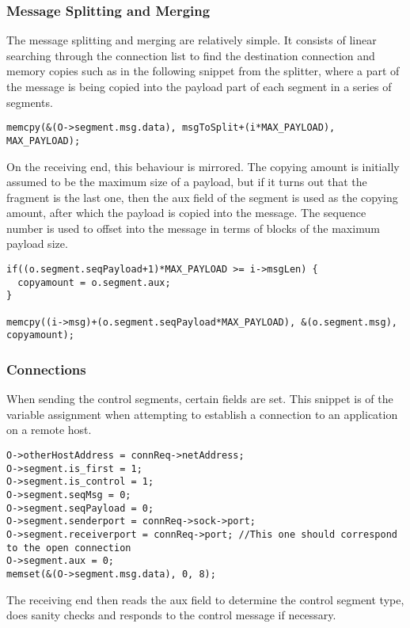 \subsubsection{Message Splitting and Merging}
The message splitting and merging are relatively simple. It consists of linear searching through the connection list to find the destination connection and memory copies such as in the following snippet from the splitter, where a part of the message is being copied into the payload part of each segment in a series of segments.
\begin{lstlisting}
memcpy(&(O->segment.msg.data), msgToSplit+(i*MAX_PAYLOAD), MAX_PAYLOAD);
\end{lstlisting}

On the receiving end, this behaviour is mirrored. The copying amount is initially assumed to be the maximum size of a payload, but if it turns out that the fragment is the last one, then the aux field of the segment is used as the copying amount, after which the payload is copied into the message. The sequence number is used to offset into the message in terms of blocks of the maximum payload size.
\begin{lstlisting}
if((o.segment.seqPayload+1)*MAX_PAYLOAD >= i->msgLen) {
  copyamount = o.segment.aux;
}

memcpy((i->msg)+(o.segment.seqPayload*MAX_PAYLOAD), &(o.segment.msg), copyamount);
\end{lstlisting}

\subsubsection{Connections}
When sending the control segments, certain fields are set. This snippet is of the variable assignment when attempting to establish a connection to an application on a remote host.
\begin{lstlisting}
O->otherHostAddress = connReq->netAddress;
O->segment.is_first = 1;
O->segment.is_control = 1;
O->segment.seqMsg = 0;
O->segment.seqPayload = 0;
O->segment.senderport = connReq->sock->port;
O->segment.receiverport = connReq->port; //This one should correspond to the open connection
O->segment.aux = 0;
memset(&(O->segment.msg.data), 0, 8);
\end{lstlisting}

The receiving end then reads the aux field to determine the control segment type, does sanity checks and responds to the control message if necessary.





\hfill \break
